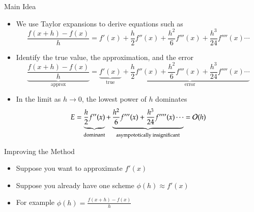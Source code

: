 \documentclass[10pt]{beamer}
\begin{document}
\begin{frame}{Main Idea}
\begin{itemize}
    \item We use Taylor expansions to derive equations such as
            \begin{equation*}
            \frac{f(x+h) -f(x)}{h}=  f'(x) + \frac{h}{2}f''(x) + \frac{h^2}{6}f'''(x)+\frac{h^3}{24}f''''(x)\cdots
            \end{equation*}
    \item<2-> Identify the true value, the approximation, and the error
    \begin{equation*}
            \underbrace{\frac{f(x+h) -f(x)}{h}}_{\text{approx}}=  \underbrace{f'(x)}_{\text{true}} + \underbrace{\frac{h}{2}f''(x) + \frac{h^2}{6}f'''(x)+\frac{h^3}{24}f''''(x)\cdots}_{\text{error}}
            \end{equation*}
    \item<3-> In the limit as $h\rightarrow 0$, the lowest power of $h$ dominates
        $$E=\underbrace{\frac{h}{2}f''(x)}_{\text{dominant}} + \underbrace{\frac{h^2}{6}f'''(x)+\frac{h^3}{24}f''''(x)\cdots}_{\text{asympototically insignificant}}={\mathcal{O}}(h)$$
    \vfill 
\end{itemize}
    
\end{frame}



\begin{frame}{Improving the Method}

\begin{itemize}
    \item Suppose you want to approximate $f'(x)$
    \vfill 

    \item Suppose you already have one scheme $\phi(h)\approx f'(x)$ 
    \vfill

    \item For example $\phi(h)=\tfrac{f(x+h)-f(x)}{h}$
    \vfill
\end{itemize}
    
\end{frame}
\end{document}
